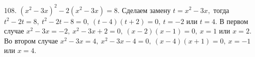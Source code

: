 108. $(x^2-3x)^2-2(x^2-3x)=8.$ Сделаем замену $t=x^2-3x,$ тогда $t^2-2t=8,\ t^2-2t-8=0,\ (t-4)(t+2)=0,\ t=-2$ или $t=4.$ В первом случае $x^2-3x=-2,\ x^2-3x+2=0,\
(x-2)(x-1)=0,\ x=1$ или $x=2.$ Во втором случае  $x^2-3x=4,\ x^2-3x-4=0,\ (x-4)(x+1)=0,\ x=-1$ или $x=4.$\\
